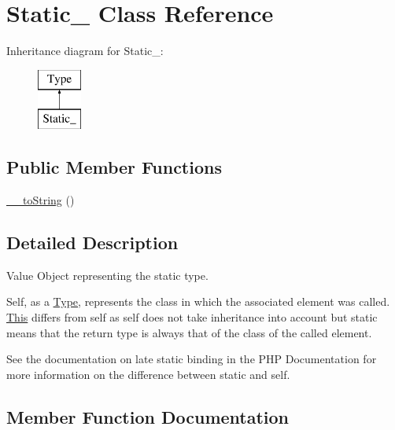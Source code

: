 \hypertarget{classphp_documentor_1_1_reflection_1_1_types_1_1_static__}{}\section{Static\+\_\+ Class Reference}
\label{classphp_documentor_1_1_reflection_1_1_types_1_1_static__}
Inheritance diagram for Static\+\_\+\+:\begin{figure}[H]
\begin{center}
\leavevmode
\includegraphics[height=2.000000cm]{classphp_documentor_1_1_reflection_1_1_types_1_1_static__}
\end{center}
\end{figure}
\subsection*{Public Member Functions}
\begin{DoxyCompactItemize}
\item 
\mbox{\hyperlink{classphp_documentor_1_1_reflection_1_1_types_1_1_static___a7516ca30af0db3cdbf9a7739b48ce91d}{\+\_\+\+\_\+to\+String}} ()
\end{DoxyCompactItemize}


\subsection{Detailed Description}
Value Object representing the \textquotesingle{}static\textquotesingle{} type.

Self, as a \mbox{\hyperlink{interfacephp_documentor_1_1_reflection_1_1_type}{Type}}, represents the class in which the associated element was called. \mbox{\hyperlink{classphp_documentor_1_1_reflection_1_1_types_1_1_this}{This}} differs from self as self does not take inheritance into account but static means that the return type is always that of the class of the called element.

See the documentation on late static binding in the P\+HP Documentation for more information on the difference between static and self. 

\subsection{Member Function Documentation}
\mbox{\label{classphp_documentor_1_1_reflection_1_1_types_1_1_static___a7516ca30af0db3cdbf9a7739b48ce91d}} 
